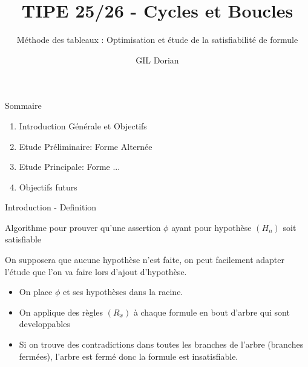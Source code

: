 \documentclass[]{beamer}
\title{TIPE 25/26 - Cycles et Boucles}
\author{GIL Dorian}
\subtitle{Méthode des tableaux : Optimisation et étude de la satisfiabilité de formule}
\date{}
\begin{document}
\begin{frame}
\titlepage
\end{frame}

\begin{frame}{Sommaire}
\begin{enumerate}
    \item Introduction Générale et Objectifs
    \item Etude Préliminaire: Forme Alternée
    \item Etude Principale: Forme ...
    \item Objectifs futurs
\end{enumerate}
\end{frame}

\begin{frame}{Introduction - Definition}
    \begin{definition}
        Algorithme pour prouver qu'une assertion $\phi$ ayant pour hypothèse $(H_n)$ soit satisfiable
    \end{definition}
    On supposera que aucune hypothèse n'est faite, on peut facilement adapter l'étude que l'on va faire lors d'ajout d'hypothèse.
    \pause
    \begin{itemize}
        \item On place $\phi$ et ses hypothèses dans la racine.
        \item On applique des règles $(R_x)$ à chaque formule en bout d'arbre qui sont developpables
        \item Si on trouve des contradictions dans toutes les branches de l'arbre (branches fermées), l'arbre est fermé donc la formule est insatisfiable.
    \end{itemize}
    \pause
\end{frame}
\end{document}
